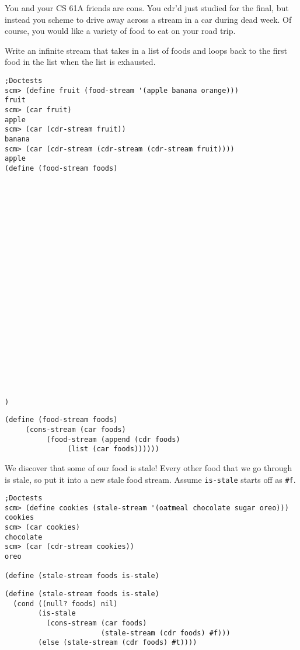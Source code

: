 \begin{blocksection}

\question
You and your CS 61A friends are cons.
You cdr'd just studied for the final, but instead you scheme to drive away across a stream in a car during dead week.
Of course, you would like a variety of food to eat on your road trip.

Write an infinite stream that takes in a list of foods and loops back to the
first food in the list when the list is exhausted.

\ifprintanswers\else

\begin{lstlisting}
;Doctests
scm> (define fruit (food-stream '(apple banana orange)))
fruit
scm> (car fruit)
apple
scm> (car (cdr-stream fruit))
banana
scm> (car (cdr-stream (cdr-stream (cdr-stream fruit))))
apple
(define (food-stream foods)























)

\end{lstlisting}
\fi

\begin{solution}[1in]
\begin{lstlisting}
(define (food-stream foods)
     (cons-stream (car foods)
          (food-stream (append (cdr foods)
               (list (car foods))))))
\end{lstlisting}
\end{solution}
\newpage
\end{blocksection}
\begin{blocksection}

We discover that some of our food is stale! Every other food that we go
through is stale, so put it into a new stale food stream. Assume
\lstinline$is-stale$ starts off as \lstinline$#f$.

\ifprintanswers\else
\begin{lstlisting}
;Doctests
scm> (define cookies (stale-stream '(oatmeal chocolate sugar oreo)))
cookies
scm> (car cookies)
chocolate
scm> (car (cdr-stream cookies))
oreo

(define (stale-stream foods is-stale)
\end{lstlisting}
\fi

\begin{solution}[1in]
\begin{lstlisting}
(define (stale-stream foods is-stale)
  (cond ((null? foods) nil)
        (is-stale
          (cons-stream (car foods)
                       (stale-stream (cdr foods) #f)))
        (else (stale-stream (cdr foods) #t))))
\end{lstlisting}
\end{solution}


\end{blocksection}
